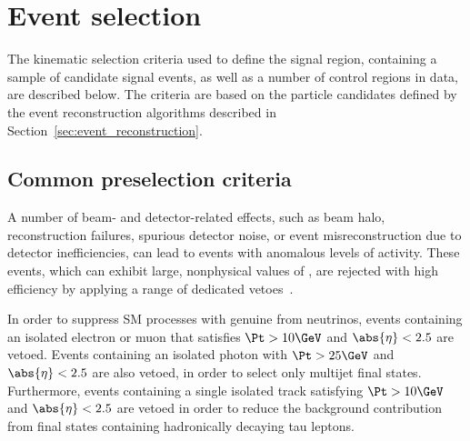 \section{Event selection}
\label{sec:event_selection}

The kinematic selection criteria used to define the signal region,
containing a sample of candidate signal events, as well as a number of
control regions in data, are described below. The criteria are based
on the particle candidates defined by the event reconstruction
algorithms described in Section~\ref{sec:event_reconstruction}.

\subsection{Common preselection criteria}
\label{sec:preselection}

A number of beam- and detector-related effects, such as beam halo,
reconstruction failures, spurious detector noise, or event
misreconstruction due to detector inefficiencies, can lead to events
with anomalous levels of activity. These events, which can exhibit
large, nonphysical values of \ETmiss, are rejected with high
efficiency by applying a range of dedicated
vetoes~\cite{1748-0221-5-03-T03014, cms-met}.

In order to suppress SM processes with genuine \ptvecmiss from
neutrinos, events containing an isolated electron or muon that
satisfies $\Pt > 10\GeV$ and $\abs{\eta} < 2.5$ are vetoed. Events
containing an isolated photon with $\Pt > 25\GeV$ and $\abs{\eta} <
2.5$ are also vetoed, in order to select only multijet final
states. Furthermore, events containing a single isolated track
satisfying $\Pt > 10\GeV$ and $\abs{\eta} < 2.5$ are vetoed in order
to reduce the background contribution from final states containing
hadronically decaying tau leptons.

